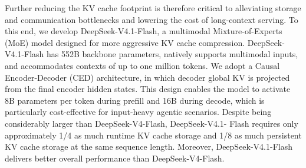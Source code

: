 \documentclass[
  10
]{article}
\begin{document}
Further reducing the KV cache footprint is therefore critical to
alleviating storage and communication bottlenecks and lowering the cost
of long-context serving. To this end, we develop DeepSeek-V4.1-Flash, a
multimodal Mixture-of-Experts (MoE) model designed for more aggressive
KV cache compression. DeepSeek-V4.1-Flash has 552B backbone parameters,
natively supports multimodal inputs, and accommodates contexts of up to
one million tokens. We adopt a Causal Encoder-Decoder (CED)
architecture, in which decoder global KV is projected from the final
encoder hidden states. This design enables the model to activate 8B
parameters per token during prefill and 16B during decode, which is
particularly cost-effective for input-heavy agentic scenarios. Despite
being considerably larger than DeepSeek-V4-Flash, DeepSeek-V4.1- Flash
requires only approximately 1/4 as much runtime KV cache storage and 1/8
as much persistent KV cache storage at the same sequence length.
Moreover, DeepSeek-V4.1-Flash delivers better overall performance than
DeepSeek-V4-Flash.
\end{document}
